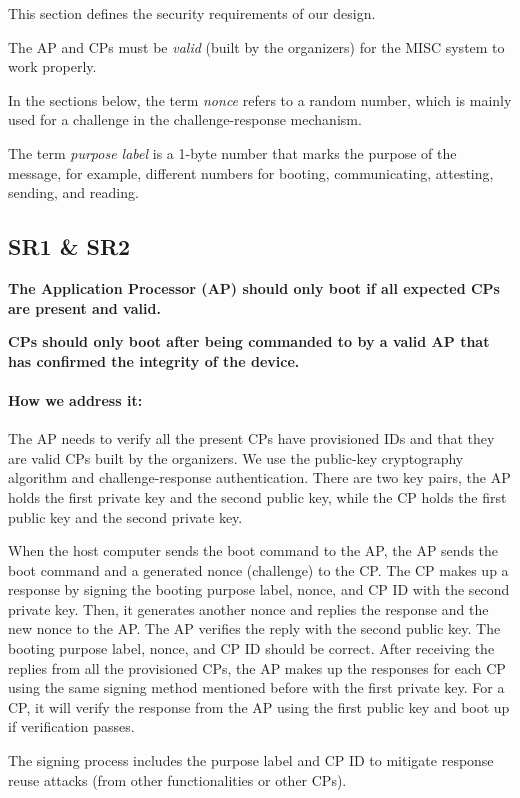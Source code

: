 \documentclass[11pt,oneside,onecolumn,letterpaper]{article}
\newcounter{alg}
\begin{document}
	This section defines the security requirements of our design.
	
	The AP and CPs must be \textit{valid} (built by the organizers) for the MISC system to work properly.
	
	In the sections below,
	the term \textit{nonce} refers to a random number,
	which is mainly used for a challenge in the challenge-response mechanism.
	
	The term \textit{purpose label} is a 1-byte number that marks the purpose of the message,
	for example,
	different numbers for booting,
	communicating,
	attesting,
	sending,
	and reading.
	
	\subsection{SR1 \& SR2}
	\textbf{The Application Processor (AP) should only boot if all expected CPs are present and valid.}
	
	\textbf{CPs should only boot after being commanded to by a valid AP that has confirmed the integrity of the device.}
	
	\paragraph{How we address it:}
	The AP needs to verify all the present CPs have provisioned IDs and that they are valid CPs built by the organizers.
	We use the public-key cryptography algorithm and challenge-response authentication.
	There are two key pairs,
	the AP holds the first private key and the second public key,
	while the CP holds the first public key and the second private key.
	
	When the host computer sends the boot command to the AP,
	the AP sends the boot command and a generated nonce (challenge) to the CP.
	The CP makes up a response by signing the booting purpose label,
	nonce,
	and CP ID with the second private key.
	Then,
	it generates another nonce and replies the response and the new nonce to the AP.
	The AP verifies the reply with the second public key.
	The booting purpose label,
	nonce,
	and CP ID should be correct.
	After receiving the replies from all the provisioned CPs,
	the AP makes up the responses for each CP using the same signing method mentioned before with the first private key.
	For a CP,
	it will verify the response from the AP using the first public key and boot up if verification passes.
	
	The signing process includes the purpose label and CP ID to mitigate response reuse attacks (from other functionalities or other CPs).
	
\end{document}
